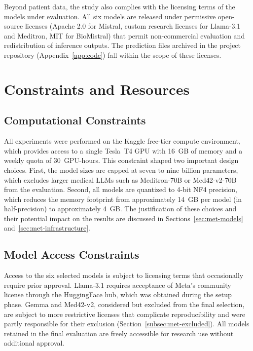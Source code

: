 Beyond patient data, the study also complies with the licensing terms 
of the models under evaluation. All six models are released under 
permissive open-source licenses (Apache 2.0 for Mistral, custom 
research licenses for Llama-3.1 and Meditron, MIT for BioMistral) 
that permit non-commercial evaluation and redistribution of 
inference outputs. The prediction files archived in the project 
repository (Appendix~\ref{app:code}) fall within the scope of these 
licenses.

\section{Constraints and Resources}
\label{sec:ctx-constraints}

\subsection{Computational Constraints}
\label{subsec:ctx-compute}

All experiments were performed on the Kaggle free-tier compute 
environment, which provides access to a single Tesla~T4 GPU with 
16~GB of memory and a weekly quota of 30~GPU-hours. This constraint 
shaped two important design choices. First, the model sizes are 
capped at seven to nine billion parameters, which excludes larger 
medical LLMs such as Meditron-70B or Med42-v2-70B from the 
evaluation. Second, all models are quantized to 4-bit NF4 precision, 
which reduces the memory footprint from approximately 14~GB per 
model (in half-precision) to approximately 4~GB. The justification 
of these choices and their potential impact on the results are 
discussed in Sections~\ref{sec:met-models} and~\ref{sec:met-infrastructure}.

\subsection{Model Access Constraints}
\label{subsec:ctx-access}

Access to the six selected models is subject to licensing terms that 
occasionally require prior approval. Llama-3.1 requires acceptance of 
Meta's community license through the HuggingFace hub, which was 
obtained during the setup phase. Gemma and Med42-v2, considered but 
excluded from the final selection, are subject to more restrictive 
licenses that complicate reproducibility and were partly responsible 
for their exclusion (Section~\ref{subsec:met-excluded}). All models 
retained in the final evaluation are freely accessible for research 
use without additional approval.

